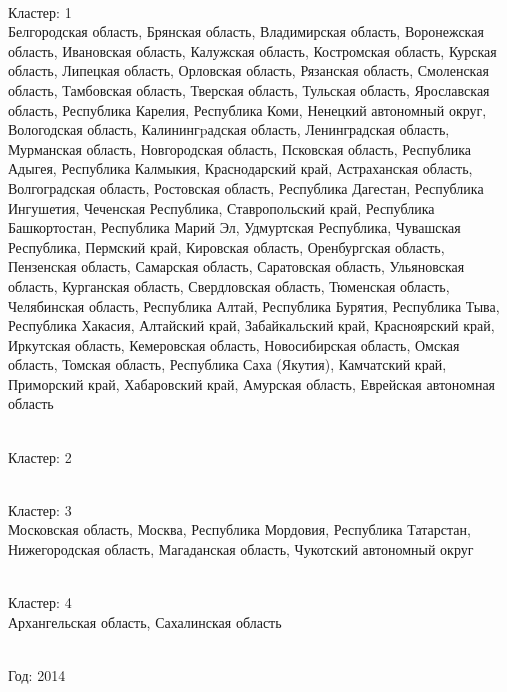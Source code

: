 \documentclass[11pt]{article}
\begin{document}
\newline \\ Кластер:  1
\\ Белгородская область, Брянская область, Владимирская область, Воронежская область, Ивановская область, Калужская область, Костромская область, Курская область, Липецкая область, Орловская область, Рязанская область, Смоленская область, Тамбовская область, Тверская область, Тульская область, Ярославская область, Республика Карелия, Республика Коми, Ненецкий автономный округ, Вологодская область, Калинингpадская область, Ленинградская область, Мурманская область, Новгородская область, Псковская область, Республика Адыгея, Республика Калмыкия, Краснодарский край, Астраханская область, Волгоградская область, Ростовская область, Республика Дагестан, Республика Ингушетия, Чеченская Республика, Ставропольский край, Республика Башкортостан, Республика Марий Эл, Удмуртская Республика, Чувашская Республика, Пермский край, Кировская область, Оренбургская область, Пензенская область, Самарская область, Саратовская область, Ульяновская область, Курганская область, Свердловская область, Тюменская область, Челябинская область, Республика Алтай, Республика Бурятия, Республика Тыва, Республика Хакасия, Алтайский край, Забайкальский край, Красноярский край, Иркутская область, Кемеровская область, Новосибирская область, Омская область, Томская область, Республика Саха (Якутия), Камчатский край, Приморский край, Хабаровский край, Амурская область, Еврейская автономная область

\newline \\ Кластер:  2


\newline \\ Кластер:  3
\\ Московская область, Москва, Республика Мордовия, Республика Татарстан, Нижегородская область, Магаданская область, Чукотский автономный округ

\newline \\ Кластер:  4
\\ Архангельская область, Сахалинская область


\newline \newline \\ Год:  2014
\end{document}
